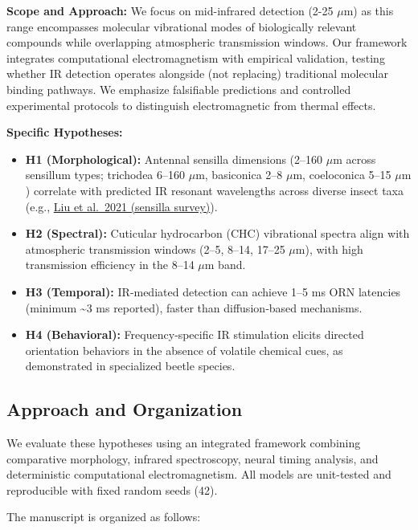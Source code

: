 \documentclass[
  13pt,
  a4paperpaper,
  12pt]{article}
\providecommand{\tightlist}{%
  \setlength{\itemsep}{0pt}\setlength{\parskip}{0pt}}
\begin{document}
\textbf{Scope and Approach:} We focus on mid-infrared detection (2-25
\(\mu\mathrm{m}\)) as this range encompasses molecular vibrational modes
of biologically relevant compounds while overlapping atmospheric
transmission windows. Our framework integrates computational
electromagnetism with empirical validation, testing whether IR detection
operates alongside (not replacing) traditional molecular binding
pathways. We emphasize falsifiable predictions and controlled
experimental protocols to distinguish electromagnetic from thermal
effects.

\textbf{Specific Hypotheses:}

\begin{itemize}
\tightlist
\item
  \textbf{H1 (Morphological):} Antennal sensilla dimensions (2--160
  \(\mu\mathrm{m}\) across sensillum types; trichodea 6--160
  \(\mu\mathrm{m}\), basiconica 2--8 \(\mu\mathrm{m}\), coeloconica
  5--15 \(\mu\mathrm{m}\)) correlate with predicted IR resonant
  wavelengths across diverse insect taxa (e.g.,
  \href{https://pmc.ncbi.nlm.nih.gov/articles/PMC7831480/}{Liu et
  al.~2021 (sensilla survey)}).
\item
  \textbf{H2 (Spectral):} Cuticular hydrocarbon (CHC) vibrational
  spectra align with atmospheric transmission windows (2--5, 8--14,
  17--25 \(\mu\mathrm{m}\)), with high transmission efficiency in the
  8--14 \(\mu\mathrm{m}\) band.
\item
  \textbf{H3 (Temporal):} IR‑mediated detection can achieve 1--5 ms ORN
  latencies (minimum \textasciitilde3 ms reported), faster than
  diffusion‑based mechanisms.
\item
  \textbf{H4 (Behavioral):} Frequency‑specific IR stimulation elicits
  directed orientation behaviors in the absence of volatile chemical
  cues, as demonstrated in specialized beetle species.
\end{itemize}

\subsection{Approach and Organization}\label{approach-and-organization}

We evaluate these hypotheses using an integrated framework combining
comparative morphology, infrared spectroscopy, neural timing analysis,
and deterministic computational electromagnetism. All models are
unit-tested and reproducible with fixed random seeds (42).

The manuscript is organized as follows:
\end{document}
